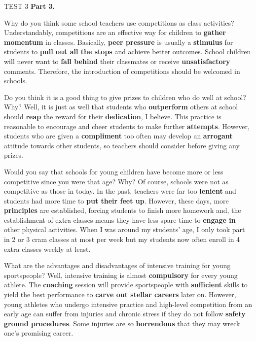 \begin{glossarymc}[Cambridge 7]
\begin{test}{TEST 3}
    \noindent
    \textbf{Part 3.}
    \begin{qa}{Why do you think some school teachers use competitions as class activities?}
    Understandably, competitions are an effective way for children to \textbf{gather momentum} in classes. Basically, \textbf{peer pressure} is usually a \textbf{stimulus} for students to \textbf{pull out all the stops} and achieve better outcomes. School children will never want to \textbf{fall behind} their classmates or receive \textbf{unsatisfactory} comments. Therefore, the introduction of competitions should be welcomed in schools.
    \end{qa}

    \begin{qa}{Do you think it is a good thing to give prizes to children who do well at school? Why?}
    Well, it is just as well that students who \textbf{outperform} others at school should \textbf{reap} the reward for their \textbf{dedication}, I believe. This practice is reasonable to encourage and cheer students to make further \textbf{attempts}. However, students who are given a \textbf{compliment} too often may develop an \textbf{arrogant} attitude towards other students, so teachers should consider before giving any prizes.
    \end{qa}

    \begin{qa}{Would you say that schools for young children have become more or less competitive since you were that age? Why?}
    Of course, schools were not as competitive as those in today. In the past, teachers were far too \textbf{lenient} and students had more time to \textbf{put their feet up}. However, these days, more \textbf{principles} are established, forcing students to finish more homework and, the establishment of extra classes means they have less spare time to \textbf{engage in} other physical activities. When I was around my students’ age, I only took part in 2 or 3 cram classes at most per week but my students now often enroll in 4 extra classes weekly at least.
    \end{qa}

    \begin{qa}{What are the advantages and disadvantages of intensive training for young sportspeople?}
    Well, intensive training is almost \textbf{compulsory} for every young athlete. The \textbf{coaching} session will provide sportspeople with \textbf{sufficient} skills to yield the best performance to \textbf{carve out stellar careers} later on. However, young athletes who undergo intensive practice and high-level competition from an early age can suffer from injuries and chronic stress if they do not follow \textbf{safety ground procedures}. Some injuries are so \textbf{horrendous} that they may wreck one’s promising career.
    \end{qa}


\end{test}
\end{glossarymc}
